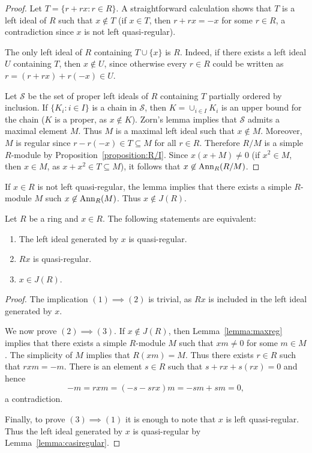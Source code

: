 \begin{proof}
	Let $T=\{r+rx:r\in R\}$. A straightforward calculation shows that $T$ is a left ideal of 
	$R$ such that $x\not\in T$ (if $x\in T$, then $r+rx=-x$ for some 
	$r\in R$, a contradiction since $x$ is not left quasi-regular). 

	The only left ideal of $R$ containing 
	$T\cup\{x\}$ is $R$. Indeed, if there exists a left ideal $U$ containing $T$, then 
    $x\not\in U$, since otherwise every $r\in R$ could be written as 
	$r=(r+rx)+r(-x)\in U$. 

	Let $\mathcal{S}$ be the set of proper left ideals of $R$ containing 
	$T$ partially ordered by inclusion. If $\{K_i:i\in I\}$ is a chain in 
	$\mathcal{S}$, then $K=\cup_{i\in I}K_i$ is an upper bound for the chain 
	($K$ is a proper, as $x\not\in K$). Zorn's lemma implies that 
	$\mathcal{S}$ admits a maximal element $M$. Thus $M$
	is a maximal left ideal such that $x\not\in M$. Moreover, $M$ is regular
	since $r-r(-x)\in T\subseteq M$ for all $r\in R$. Therefore $R/M$ is a simple 
	$R$-module by Proposition~\ref{proposition:R/I}. Since $x(x+M)\ne
	0$ (if $x^2\in M$, then  $x\in M$, as $x+x^2\in
	T\subseteq M$), it follows that $x\not\in\operatorname{Ann}_R(R/M)$.
\end{proof}

If $x\in R$ is not left quasi-regular, the lemma implies that there exists 
a simple $R$-module $M$ such $x\not\in\operatorname{Ann}_R(M)$. Thus 
$x\not\in J(R)$.

\begin{theorem}
	\label{thm:casireg_eq}
	Let $R$ be a ring and $x\in R$. The following statements are equivalent: 
	\begin{enumerate}
		\item The left ideal generated by $x$ is quasi-regular.
		\item $Rx$ is quasi-regular.
		\item $x\in J(R)$.
	\end{enumerate}
\end{theorem}

\begin{proof}
	The implication $(1)\implies(2)$ is trivial, as $Rx$ is included in the left ideal 
	generated by $x$.  
	
	We now prove $(2)\implies(3)$. If
	$x\not\in J(R)$, then Lemma~\ref{lemma:maxreg} implies that there exists a simple 
	$R$-module $M$ such that $xm\ne 0$ for some $m\in M$. The simplicity of $M$ implies
	that $R(xm)=M$. Thus there exists $r\in R$ such that $rxm=-m$. There is an element 
	$s\in R$ such that $s+rx+s(rx)=0$ and hence 
	\[
	-m=rxm=(-s-srx)m=-sm+sm=0,
	\]
	a contradiction. 
	
	Finally, to prove $(3)\implies(1)$ it is enough to note that 
	$x$ is left quasi-regular. Thus the left ideal generated by 
	$x$ is quasi-regular by Lemma~\ref{lemma:casiregular}.
\end{proof}

